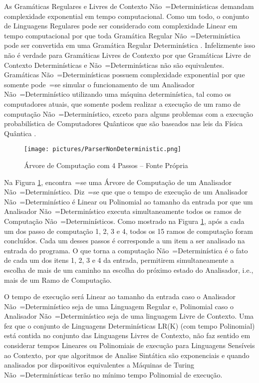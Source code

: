 {    As Gramáticas Regulares e
    Livres de Contexto Não~=Determinísticas demandam
    complexidade exponential em tempo computacional.
    Como um todo,
    o conjunto de Linguagens Regulares pode ser considerado com complexidade Linear em
    tempo computacional por que toda Gramática Regular Não~=Determinística pode ser
    convertida em uma Gramática Regular Determinística \cite{sipserBook}.
    Infelizmente isso não é verdade para Gramáticas Livres de Contexto
    por que Gramáticas Livre de Contexto Determinísticas e
    Não~=Determinísticas não são equivalentes.
    Gramáticas Não~=Determinísticas possuem complexidade exponential por
    que somente pode~=se simular o funcionamento de um Analisador
    Não~=Determinístico utilizando uma máquina determinística,
    tal como os computadores atuais,
    que somente podem realizar a execução de um ramo de computação Não~=Determinístico,
    exceto para alguns problemas com a execução probabilística de Computadores
    Quânticos \cite{nonlinearQuantumComputers} que são baseados nas leis da
    Física Quântica \cite{dicke1963QuantumPhysicsIntroduction}.
    \begin{figure}[H]
    \centering
    \texttt{[image: pictures/ParserNonDeterministic.png]}
    \caption{Árvore de Computação com 4 Passos -- Fonte Própria}
    \label{fig:pictures/ParserNonDeterministic.png}
    \end{figure}

    Na Figura \ref{fig:pictures/ParserNonDeterministic.png},
    encontra~=se uma Árvore de Computação de um Analisador Não~=Determinístico.
    Diz~=se que que o tempo de execução de um Analisador Não~=Determinístico é Linear
    ou Polinomial ao tamanho da entrada por que um Analisador Não~=Determinístico
    executa simultaneamente todos os ramos de Computação Não~=Determinísticos.
    Como mostrado na Figura \ref{fig:pictures/ParserNonDeterministic.png},
    após a cada um dos passo de computação 1,
    2, 3 e 4,
    todos os 15 ramos de computação foram concluídos.
    Cada um desses passos é corresponde a um item a ser analisado na entrada do programa.
    O que torna a computação Não~=Determinística é o fato de cada um dos itens 1,
    2, 3 e 4 da entrada,
    permitirem simultaneamente a escolha de mais de um
    caminho na escolha do próximo estado do Analisador,
    i.e.,
    mais de um Ramo de Computação.

    O tempo de execução será Linear ao tamanho da entrada caso o
    Analisador Não~=Determinístico seja de uma Linguagem Regular e,
    Polinomial caso o Analisador Não~=Determinístico seja de uma linguagem Livre de Contexto.
    Uma fez que o conjunto de Linguagens Determinísticas LR(K) (com tempo
    Polinomial) está contida no conjunto das Linguagens Livres de Contexto,
    não faz sentido em considerar tempos Lineares ou Polinomiais
    de execução para Linguagens Sensíveis ao Contexto,
    por que algoritmos de Analise Sintática são exponenciais \cite{contextSensitiveParsing} e
    quando analisados por dispositivos equivalentes a Máquinas de Turing
    Não~=Determinísticas terão no mínimo tempo Polinomial de execução.

}
